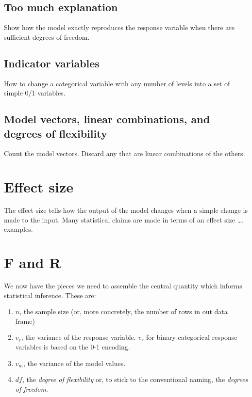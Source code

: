 \documentclass[]{book}
\providecommand{\tightlist}{%
  \setlength{\itemsep}{0pt}\setlength{\parskip}{0pt}}
\begin{document}
\hypertarget{too-much-explanation}{%
\section{Too much explanation}\label{too-much-explanation}}

Show how the model exactly reproduces the response variable when there are sufficient degrees of freedom.

\hypertarget{indicator-variables-1}{%
\section{Indicator variables}\label{indicator-variables-1}}

How to change a categorical variable with any number of levels into a set of simple 0/1 variables.

\hypertarget{model-vectors-linear-combinations-and-degrees-of-flexibility}{%
\section{Model vectors, linear combinations, and degrees of flexibility}\label{model-vectors-linear-combinations-and-degrees-of-flexibility}}

Count the model vectors. Discard any that are linear combinations of the others.

\hypertarget{effect-size}{%
\chapter{Effect size}\label{effect-size}}

The effect size tells how the output of the model changes when a simple change is made to the input. Many statistical claims are made in terms of an effect size \ldots{}. examples.

\hypertarget{f-and-r}{%
\chapter{F and R}\label{f-and-r}}

We now have the pieces we need to assemble the central quantity which informs statistical inference. These are:

\begin{enumerate}
\def\labelenumi{\arabic{enumi}.}
\tightlist
\item
  \(n\), the sample size (or, more concretely, the number of rows in out data frame)
\item
  \(v_r\), the variance of the response variable. \(v_r\) for binary categorical response variables is based on the 0-1 encoding.
\item
  \(v_m\), the variance of the model values.
\item
  \(df\), the \emph{degree of flexibility} or, to stick to the conventional naming, the \emph{degrees of freedom}.
\end{enumerate}
\end{document}
